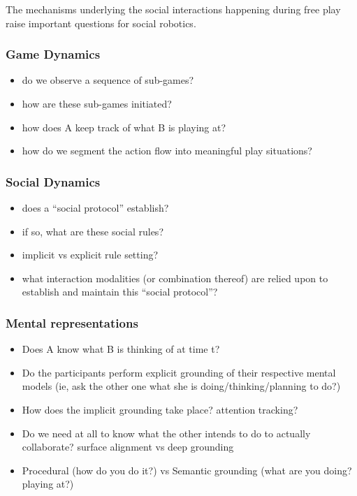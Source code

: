 \documentclass{article}
\begin{document}
The mechanisms underlying the social interactions happening during free play
raise important questions for social robotics.


\subsubsection{Game Dynamics}

\begin{itemize}
    \item do we observe a sequence of sub-games?
    \item how are these sub-games initiated?
    \item how does A keep track of what B is playing at?
    \item how do we segment the action flow into meaningful play situations?
\end{itemize}

\subsubsection{Social Dynamics}

\begin{itemize}
    \item does a ``social protocol'' establish?
    \item if so, what are these social rules?
    \item implicit vs explicit rule setting?
    \item what interaction modalities (or combination thereof) are relied upon
        to establish and maintain this ``social protocol''?
\end{itemize}

\subsubsection{Mental representations}

\begin{itemize}
    \item Does A know what B is thinking of at time t?
    \item Do the participants perform explicit grounding of their respective mental models
        (ie, ask the other one what she is doing/thinking/planning to do?)
    \item How does the implicit grounding take place? attention tracking?
    \item Do we need at all to know what the other intends to do to actually
        collaborate? surface alignment vs deep grounding
    \item Procedural (how do you do it?) vs Semantic
        grounding (what are you doing? playing at?)
\end{itemize}
\end{document}
